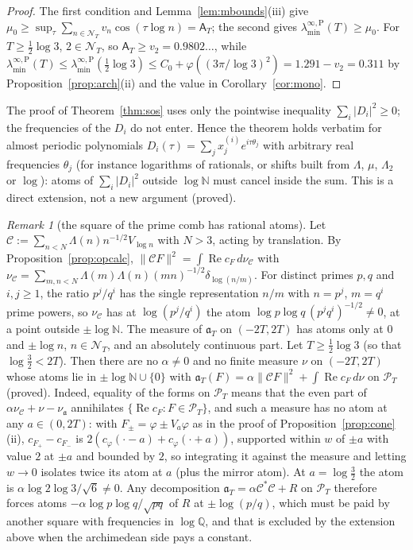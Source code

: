\documentclass[11pt]{amsart}
\theoremstyle{definition}
\theoremstyle{remark}
\newtheorem{remark}[theorem]{Remark}
\newcommand{\N}{\mathbb N}
\newcommand{\Rel}{\operatorname{Re}}
\newcommand{\PT}{\mathcal P_T}
\newcommand{\cF}{c_F}
\newcommand{\NT}{\mathcal N_T}
\newcommand{\Aconst}{\mathsf A_T}
\newcommand{\laminfP}{\lambda^{\infty,\mathrm P}_{\min}}
\begin{document}
\begin{proof}
The first condition and Lemma~\ref{lem:mbounds}(iii) give $\mu_0\ge\sup_\tau\sum_{n\in\NT}v_n\cos(\tau\log n)=\Aconst$; the second gives
$\laminfP(T)\ge\mu_0$. For $T\ge\frac12\log3$, $2\in\NT$, so $\Aconst\ge v_2=0.9802\ldots$, while
$\laminfP(T)\le\laminfP(\frac12\log3)\le C_0+\varphi((3\pi/\log3)^2)=1.291-v_2=0.311$ by Proposition~\ref{prop:arch}(ii) and the value in
Corollary~\ref{cor:mono}.
\end{proof}

The proof of Theorem~\ref{thm:sos} uses only the pointwise inequality $\sum_i|D_i|^2\ge0$; the frequencies of the
$D_i$ do not enter. Hence the theorem holds verbatim for almost periodic polynomials
$D_i(\tau)=\sum_jx^{(i)}_je^{i\tau\theta_j}$ with arbitrary real frequencies $\theta_j$ (for instance logarithms of
rationals, or shifts built from $\Lambda$, $\mu$, $\Lambda_2$ or $\log$): atoms of $\sum_i|D_i|^2$ outside $\log\N$ must
cancel inside the sum. This is a direct extension, not a new argument (proved).

\begin{remark}[the square of the prime comb has rational atoms]\label{rem:sosatoms}
Let $\mathcal C:=\sum_{n<N}\Lambda(n)n^{-1/2}V_{\log n}$ with $N>3$, acting by translation. By Proposition~\ref{prop:opcalc},
$\|\mathcal CF\|^2=\int\Rel\cF\,d\nu_{\mathcal C}$ with $\nu_{\mathcal C}=\sum_{m,n<N}\Lambda(m)\Lambda(n)(mn)^{-1/2}\delta_{\log(n/m)}$.
For distinct primes $p,q$ and $i,j\ge1$, the ratio $p^j/q^i$ has the single representation $n/m$ with $n=p^j$, $m=q^i$
prime powers, so $\nu_{\mathcal C}$ has at $\log(p^j/q^i)$ the atom $\log p\log q\,(p^jq^i)^{-1/2}\ne0$, at a point
outside $\pm\log\N$. The measure of $\mathfrak a_T$ on $(-2T,2T)$ has atoms only at $0$ and $\pm\log n$, $n\in\NT$, and an
absolutely continuous part. Let $T\ge\frac12\log3$ (so that $\log\frac32<2T$). Then there are no $\alpha\ne0$ and no finite
measure $\nu$ on $(-2T,2T)$ whose atoms lie in $\pm\log\N\cup\{0\}$ with $\mathfrak a_T(F)=\alpha\|\mathcal CF\|^2+\int\Rel\cF\,d\nu$
on $\PT$ (proved). Indeed, equality of the forms on $\PT$ means that the even part of
$\alpha\nu_{\mathcal C}+\nu-\nu_{\mathfrak a}$ annihilates $\{\Rel\cF:F\in\PT\}$, and such a measure has no atom at any
$a\in(0,2T)$: with $F_\pm=\varphi\pm V_a\varphi$ as in the proof of Proposition~\ref{prop:cone}(ii), $c_{F_+}-c_{F_-}$ is
$2(c_\varphi(\cdot-a)+c_\varphi(\cdot+a))$, supported within $w$ of $\pm a$ with value $2$ at $\pm a$ and bounded by $2$,
so integrating it against the measure and letting $w\to0$ isolates twice its atom at $a$ (plus the mirror atom). At
$a=\log\frac32$ the atom is $\alpha\log2\log3/\sqrt6\ne0$. Any decomposition $\mathfrak a_T=\alpha\mathcal C^*\mathcal C+R$ on
$\PT$ therefore forces atoms $-\alpha\log p\log q/\sqrt{pq}$ of $R$ at $\pm\log(p/q)$, which must be paid by another square
with frequencies in $\log\mathbb Q$, and that is excluded by the extension above when the archimedean side pays a constant.
\end{remark}
\end{document}
